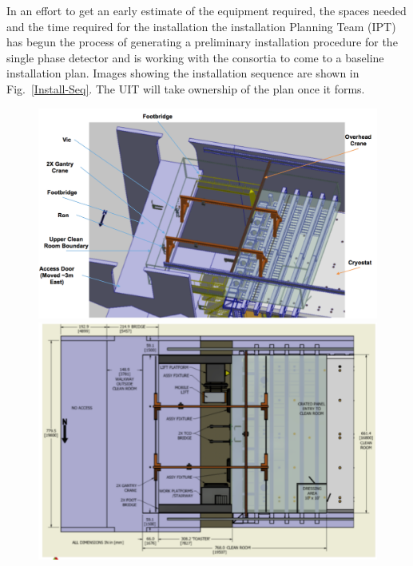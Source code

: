 In an effort to get an early estimate of the equipment required, the
spaces needed and the time required for the installation the
installation Planning Team (IPT) has begun the process of generating a
preliminary installation procedure for the single phase detector and
is working with the consortia to come to a baseline installation
plan. Images showing the installation sequence are shown in
Fig.~\ref{Install-Seq}. The UIT will take ownership of the plan once
it forms.  
\begin{figure}[!htb]
\begin{center}
\begin{minipage}[c]{0.49\textwidth}
\includegraphics[width=\textwidth]{far-detector-single-phase/figures/Install-ISO-Top.pdf}
\end{minipage}
\begin{minipage}[c]{0.49\textwidth}
\includegraphics[width=\textwidth]{far-detector-single-phase/figures/Install-TopView.pdf}

\end{minipage}
\end{center}
\end{figure}
